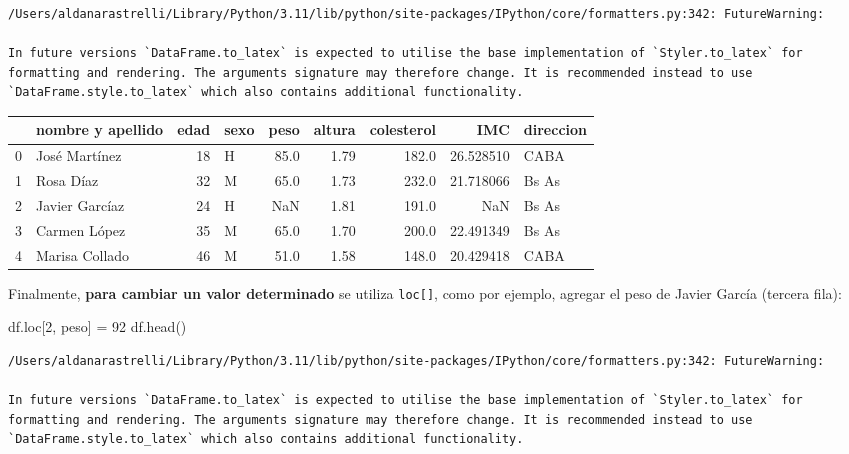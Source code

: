 \documentclass[
  letterpaper,
  DIV=11,
  numbers=noendperiod]{scrreprt}
\newenvironment{Shaded}{\begin{snugshade}}{\end{snugshade}}
\newcommand{\DecValTok}[1]{\textcolor[rgb]{0.68,0.00,0.00}{#1}}
\newcommand{\NormalTok}[1]{\textcolor[rgb]{0.00,0.23,0.31}{#1}}
\newcommand{\OperatorTok}[1]{\textcolor[rgb]{0.37,0.37,0.37}{#1}}
\newcommand{\StringTok}[1]{\textcolor[rgb]{0.13,0.47,0.30}{#1}}
\begin{document}
\begin{verbatim}
/Users/aldanarastrelli/Library/Python/3.11/lib/python/site-packages/IPython/core/formatters.py:342: FutureWarning:

In future versions `DataFrame.to_latex` is expected to utilise the base implementation of `Styler.to_latex` for formatting and rendering. The arguments signature may therefore change. It is recommended instead to use `DataFrame.style.to_latex` which also contains additional functionality.
\end{verbatim}

\begin{tabular}{llrlrrrrl}
\toprule
{} & nombre y apellido &  edad & sexo &  peso &  altura &  colesterol &        IMC & direccion \\
\midrule
0 &     José Martínez &    18 &    H &  85.0 &    1.79 &       182.0 &  26.528510 &      CABA \\
1 &         Rosa Díaz &    32 &    M &  65.0 &    1.73 &       232.0 &  21.718066 &     Bs As \\
2 &    Javier Garcíaz &    24 &    H &   NaN &    1.81 &       191.0 &        NaN &     Bs As \\
3 &      Carmen López &    35 &    M &  65.0 &    1.70 &       200.0 &  22.491349 &     Bs As \\
4 &    Marisa Collado &    46 &    M &  51.0 &    1.58 &       148.0 &  20.429418 &      CABA \\
\bottomrule
\end{tabular}

Finalmente, \textbf{para cambiar un valor determinado} se utiliza
\texttt{loc{[}{]}}, como por ejemplo, agregar el peso de Javier García
(tercera fila):

\begin{Shaded}
\begin{Highlighting}[]
\NormalTok{df.loc[}\DecValTok{2}\NormalTok{, }\StringTok{\textquotesingle{}peso\textquotesingle{}}\NormalTok{] }\OperatorTok{=} \DecValTok{92}
\NormalTok{df.head()}
\end{Highlighting}
\end{Shaded}

\begin{verbatim}
/Users/aldanarastrelli/Library/Python/3.11/lib/python/site-packages/IPython/core/formatters.py:342: FutureWarning:

In future versions `DataFrame.to_latex` is expected to utilise the base implementation of `Styler.to_latex` for formatting and rendering. The arguments signature may therefore change. It is recommended instead to use `DataFrame.style.to_latex` which also contains additional functionality.
\end{verbatim}
\end{document}
